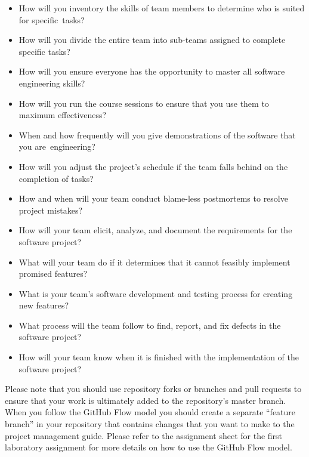 \documentclass[11pt]{article}
\begin{document}
\begin{itemize}

  \setlength{\itemsep}{0pt}

\item How will you inventory the skills of team members to determine who is
  suited for \mbox{specific tasks}?

\item How will you divide the entire team into sub-teams assigned to complete
  specific tasks?

\item How will you ensure everyone has the opportunity to master all software
  engineering skills?

\item How will you run the course sessions to ensure that you use them
  to maximum effectiveness?

\item When and how frequently will you give demonstrations of the software that
  you \mbox{are engineering}?

\item How will you adjust the project's schedule if the team falls behind on the
  completion of tasks?

\item How and when will your team conduct blame-less postmortems to resolve
  project mistakes?

\item How will your team elicit, analyze, and document the requirements for the
  software project?

\item What will your team do if it determines that it cannot feasibly implement
  promised features?

\item What is your team's software development and testing process for creating
  new features?

\item What process will the team follow to find, report, and fix defects in the
  software project?

\item How will your team know when it is finished with the implementation of the
  software project?

\end{itemize}

Please note that you should use repository forks or branches and pull requests
to ensure that your work is ultimately added to the repository's master branch.
%
When you follow the GitHub Flow model you should create a separate ``feature
branch'' in your repository that contains changes that you want to make to the
project management guide. Please refer to the assignment sheet for the first
laboratory assignment for more details on how to use the GitHub Flow model.
\end{document}
